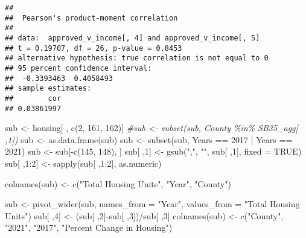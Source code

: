 \documentclass[
]{article}
\newenvironment{Shaded}{\begin{snugshade}}{\end{snugshade}}
\newcommand{\AttributeTok}[1]{\textcolor[rgb]{0.77,0.63,0.00}{#1}}
\newcommand{\CommentTok}[1]{\textcolor[rgb]{0.56,0.35,0.01}{\textit{#1}}}
\newcommand{\ConstantTok}[1]{\textcolor[rgb]{0.00,0.00,0.00}{#1}}
\newcommand{\DecValTok}[1]{\textcolor[rgb]{0.00,0.00,0.81}{#1}}
\newcommand{\FunctionTok}[1]{\textcolor[rgb]{0.00,0.00,0.00}{#1}}
\newcommand{\NormalTok}[1]{#1}
\newcommand{\OtherTok}[1]{\textcolor[rgb]{0.56,0.35,0.01}{#1}}
\newcommand{\SpecialCharTok}[1]{\textcolor[rgb]{0.00,0.00,0.00}{#1}}
\newcommand{\StringTok}[1]{\textcolor[rgb]{0.31,0.60,0.02}{#1}}
\begin{document}
\begin{verbatim}
## 
##  Pearson's product-moment correlation
## 
## data:  approved_v_income[, 4] and approved_v_income[, 5]
## t = 0.19707, df = 26, p-value = 0.8453
## alternative hypothesis: true correlation is not equal to 0
## 95 percent confidence interval:
##  -0.3393463  0.4058493
## sample estimates:
##        cor 
## 0.03861997
\end{verbatim}

\begin{Shaded}
\begin{Highlighting}[]
\NormalTok{sub }\OtherTok{\textless{}{-}}\NormalTok{ housing[ , }\FunctionTok{c}\NormalTok{(}\DecValTok{2}\NormalTok{, }\DecValTok{161}\NormalTok{, }\DecValTok{162}\NormalTok{)]}
\CommentTok{\#sub \textless{}{-} subset(sub, County \%in\% SB35\_agg[ ,1])}
\NormalTok{sub }\OtherTok{\textless{}{-}} \FunctionTok{as.data.frame}\NormalTok{(sub)}
\NormalTok{sub }\OtherTok{\textless{}{-}} \FunctionTok{subset}\NormalTok{(sub, Years }\SpecialCharTok{==} \DecValTok{2017} \SpecialCharTok{|}\NormalTok{ Years }\SpecialCharTok{==} \DecValTok{2021}\NormalTok{)}
\NormalTok{sub }\OtherTok{\textless{}{-}}\NormalTok{ sub[}\SpecialCharTok{{-}}\FunctionTok{c}\NormalTok{(}\DecValTok{145}\NormalTok{, }\DecValTok{148}\NormalTok{), ]}
\NormalTok{sub[ ,}\DecValTok{1}\NormalTok{] }\OtherTok{\textless{}{-}} \FunctionTok{gsub}\NormalTok{(}\StringTok{","}\NormalTok{, }\StringTok{""}\NormalTok{, sub[ ,}\DecValTok{1}\NormalTok{], }\AttributeTok{fixed =} \ConstantTok{TRUE}\NormalTok{)}
\NormalTok{sub[ ,}\DecValTok{1}\SpecialCharTok{:}\DecValTok{2}\NormalTok{] }\OtherTok{\textless{}{-}} \FunctionTok{sapply}\NormalTok{(sub[ ,}\DecValTok{1}\SpecialCharTok{:}\DecValTok{2}\NormalTok{], as.numeric)}


\FunctionTok{colnames}\NormalTok{(sub) }\OtherTok{\textless{}{-}} \FunctionTok{c}\NormalTok{(}\StringTok{"Total Housing Units"}\NormalTok{, }\StringTok{"Year"}\NormalTok{, }\StringTok{"County"}\NormalTok{)}

\NormalTok{sub }\OtherTok{\textless{}{-}} \FunctionTok{pivot\_wider}\NormalTok{(sub, }\AttributeTok{names\_from =} \StringTok{"Year"}\NormalTok{, }\AttributeTok{values\_from =} \StringTok{"Total Housing Units"}\NormalTok{)}
\NormalTok{sub[ ,}\DecValTok{4}\NormalTok{] }\OtherTok{\textless{}{-}}\NormalTok{ (sub[ ,}\DecValTok{2}\NormalTok{]}\SpecialCharTok{{-}}\NormalTok{sub[ ,}\DecValTok{3}\NormalTok{])}\SpecialCharTok{/}\NormalTok{sub[ ,}\DecValTok{3}\NormalTok{]}
\FunctionTok{colnames}\NormalTok{(sub) }\OtherTok{\textless{}{-}} \FunctionTok{c}\NormalTok{(}\StringTok{"County"}\NormalTok{, }\StringTok{"2021"}\NormalTok{,  }\StringTok{"2017"}\NormalTok{, }\StringTok{"Percent Change in Housing"}\NormalTok{)}


\end{Highlighting}
\end{Shaded}
\end{document}
